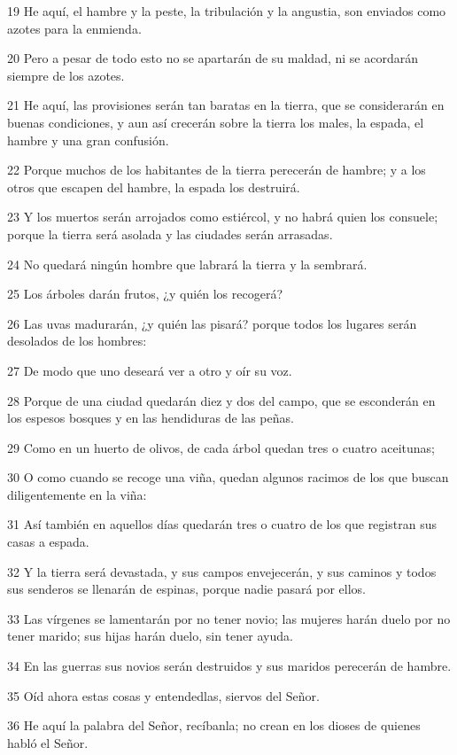 \par 19 He aquí, el hambre y la peste, la tribulación y la angustia, son enviados como azotes para la enmienda.
\par 20 Pero a pesar de todo esto no se apartarán de su maldad, ni se acordarán siempre de los azotes.
\par 21 He aquí, las provisiones serán tan baratas en la tierra, que se considerarán en buenas condiciones, y aun así crecerán sobre la tierra los males, la espada, el hambre y una gran confusión.
\par 22 Porque muchos de los habitantes de la tierra perecerán de hambre; y a los otros que escapen del hambre, la espada los destruirá.
\par 23 Y los muertos serán arrojados como estiércol, y no habrá quien los consuele; porque la tierra será asolada y las ciudades serán arrasadas.
\par 24 No quedará ningún hombre que labrará la tierra y la sembrará.
\par 25 Los árboles darán frutos, ¿y quién los recogerá?
\par 26 Las uvas madurarán, ¿y quién las pisará? porque todos los lugares serán desolados de los hombres:
\par 27 De modo que uno deseará ver a otro y oír su voz.
\par 28 Porque de una ciudad quedarán diez y dos del campo, que se esconderán en los espesos bosques y en las hendiduras de las peñas.
\par 29 Como en un huerto de olivos, de cada árbol quedan tres o cuatro aceitunas;
\par 30 O como cuando se recoge una viña, quedan algunos racimos de los que buscan diligentemente en la viña:
\par 31 Así también en aquellos días quedarán tres o cuatro de los que registran sus casas a espada.
\par 32 Y la tierra será devastada, y sus campos envejecerán, y sus caminos y todos sus senderos se llenarán de espinas, porque nadie pasará por ellos.
\par 33 Las vírgenes se lamentarán por no tener novio; las mujeres harán duelo por no tener marido; sus hijas harán duelo, sin tener ayuda.
\par 34 En las guerras sus novios serán destruidos y sus maridos perecerán de hambre.
\par 35 Oíd ahora estas cosas y entendedlas, siervos del Señor.
\par 36 He aquí la palabra del Señor, recíbanla; no crean en los dioses de quienes habló el Señor.
